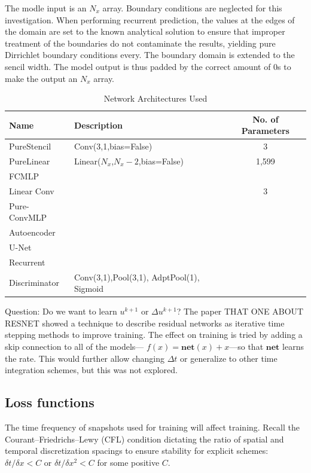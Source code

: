 \documentclass{article}
\begin{document}
The modle input is an $N_x$ array. Boundary conditions are neglected for this investigation. When
performing recurrent prediction, the values at the edges of the domain are set to
the known analytical solution to ensure that improper treatment of the
boundaries do not contaminate the results, yielding pure Dirrichlet
boundary conditions every. The boundary domain is extended to the
sencil width. The model output is thus padded by the correct amount of 0s to make the output an $N_x$ array.


\begin{table}
  \caption{\label{tab:network}Network Architectures Used}
  \begin{tabular}{llc}
    \toprule
    Name & Description & No. of Parameters \\
    \midrule
    PureStencil & Conv(3,1,bias=False) & 3 \\
    PureLinear & Linear($N_x$,$N_x-2$,bias=False) & 1,599 \\
    FCMLP & & \\
    Linear Conv & & 3 \\
    Pure-ConvMLP & &  \\
    Autoencoder & & \\
    U-Net & &  \\
    Recurrent & & \\
    \midrule
    Discriminator & Conv(3,1),Pool(3,1), AdptPool(1), Sigmoid & \\
    \bottomrule
  \end{tabular}
\end{table}

Question: Do we want to learn $u^{k+1}$ or $\Delta u^{k+1}$?
The paper THAT ONE ABOUT RESNET showed a technique to describe residual networks as iterative time stepping methods to improve training. The effect on training is tried by adding a skip connection to all of the models--- $f(x)=\mathbf{net}(x)+x$---so that $\mathbf{net}$ learns the rate. This would further allow changing $\Delta t$ or generalize to other time integration schemes, but this was not explored.

\subsection{Loss functions}
The time frequency of snapshots used for training will affect training.
Recall the Courant–Friedrichs–Lewy (CFL) condition dictating the ratio
of spatial and temporal discretization spacings to ensure stability
for explicit schemes: $\delta t / \delta x < C$ or $\delta t / \delta
x^2<C$ for some positive $C$.
\end{document}
